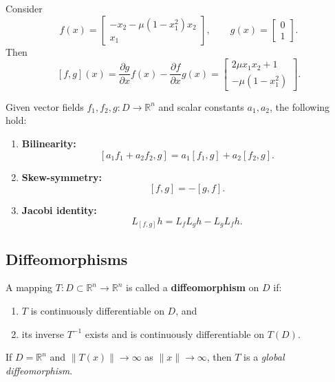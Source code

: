 \begin{example}
Consider
\[
f(x) =
\begin{bmatrix}
 -x_2 - \mu(1 - x_1^2)x_2 \\[4pt]
 x_1
\end{bmatrix}, 
\qquad
g(x) =
\begin{bmatrix}
 0 \\[4pt]
 1
\end{bmatrix}.
\]
Then
\[
[f,g](x) = 
\frac{\partial g}{\partial x} f(x) - \frac{\partial f}{\partial x} g(x)
=
\begin{bmatrix}
 2 \mu x_1 x_2 + 1 \\[4pt]
 -\mu(1 - x_1^2)
\end{bmatrix}.
\]
\end{example}

\begin{lemma}\label{lem:Lie_properties}
Given vector fields $f_1, f_2, g : D \to \mathbb{R}^n$ and scalar constants $a_1, a_2$, the following hold:
\begin{enumerate}
    \item \textbf{Bilinearity:}
    \[
    [a_1 f_1 + a_2 f_2, g] = a_1 [f_1,g] + a_2 [f_2,g].
    \]
    \item \textbf{Skew-symmetry:}
    \[
    [f,g] = -[g,f].
    \]
    \item \textbf{Jacobi identity:}
    \[
    L_{[f,g]} h = L_f L_g h - L_g L_f h.
    \]
\end{enumerate}
\end{lemma}

\subsection{Diffeomorphisms}

\begin{definition}[Diffeomorphism]\label{def:diffeomorphism}
A mapping $T : D \subset \mathbb{R}^n \to \mathbb{R}^n$ is called a 
\textbf{diffeomorphism} on $D$ if:
\begin{enumerate}
    \item $T$ is continuously differentiable on $D$, and
    \item its inverse $T^{-1}$ exists and is continuously differentiable on $T(D)$.
\end{enumerate}
If $D = \mathbb{R}^n$ and $\|T(x)\| \to \infty$ as $\|x\| \to \infty$, 
then $T$ is a \emph{global diffeomorphism}.
\end{definition}

